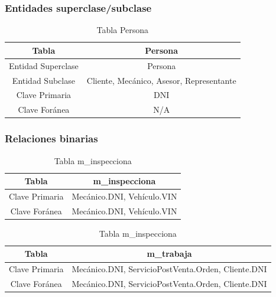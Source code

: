 \documentclass[12pt]{article}
\begin{document}
\newpage

\subsubsection{Entidades superclase/subclase}

\begin{table}[htbp]
\begin{center}
\begin{tabular}{|c|c|}
\hline
Tabla & Persona \\
\hline
Entidad Superclase & Persona \\
\hline
Entidad Subclase & Cliente, Mecánico, Asesor, Representante \\
\hline
Clave Primaria & DNI \\
\hline
Clave Foránea & N/A \\
\hline
\end{tabular}        
\caption{Tabla Persona}
\end{center}
\end{table}

\newpage

\subsubsection{Relaciones binarias}

\begin{table}[htbp]
\begin{center}
\begin{tabular}{|c|c|}
\hline
Tabla & m\_inspecciona \\
\hline
Clave Primaria & Mecánico.DNI, Vehículo.VIN \\
\hline
Clave Foránea & Mecánico.DNI, Vehículo.VIN \\
\hline
\end{tabular}
\caption{Tabla m\_inspecciona}
\end{center}
\end{table}

\begin{table}[htbp]
\begin{center}
\begin{tabular}{|c|c|}
\hline
Tabla & m\_trabaja \\
\hline
Clave Primaria & Mecánico.DNI, ServicioPostVenta.Orden, Cliente.DNI \\
\hline
Clave Foránea & Mecánico.DNI, ServicioPostVenta.Orden, Cliente.DNI \\
\hline
\end{tabular}
\caption{Tabla m\_inspecciona}
\end{center}
\end{table}
\end{document}
